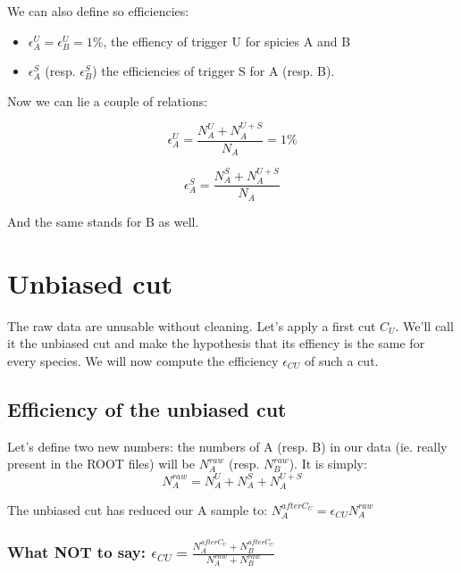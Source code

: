 \documentclass[fleqn,twoside]{article}
\begin{document}
We can also define so efficiencies:
\begin{itemize}
\item $\epsilon_{A}^{U} = \epsilon_{B}^{U} = 1 \%$, the effiency of trigger U for spicies A and B
\item $\epsilon_{A}^{S}$ (resp. $\epsilon_{B}^{S}$) the efficiencies of trigger S for A (resp. B).
\end{itemize}

Now we can lie a couple of relations:

\begin{equation}
  \epsilon_{A}^{U} = \frac{N_{A}^{U} + N_{A}^{U+S}}{N_{A}} = 1 \%
\end{equation}


\begin{equation}
  \epsilon_{A}^{S} = \frac{N_{A}^{S} + N_{A}^{U+S}}{N_{A}}
\end{equation}

And the same stands for B as well.




\section{Unbiased cut}
The raw data are unusable without cleaning. Let's apply a first cut $C_{U}$. We'll call it the unbiased cut and make the hypothesis that its effiency is the same for every species. We will now compute the efficiency $\epsilon_{CU}$ of such a cut.

\subsection{Efficiency of the unbiased cut}
Let's define two new numbers: the numbers of A (resp. B) in our data (ie. really present in the ROOT files) will be $N_{A}^{raw}$ (resp. $N_{B}^{raw}$). It is simply:
\begin{equation}
  \label{rawSample}
  N_{A}^{raw} = N_{A}^{U} + N_{A}^{S} + N_{A}^{U+S}
\end{equation}

The unbiased cut has reduced our A sample to:
$N_{A}^{after C_{U}} = \epsilon_{CU} N_{A}^{raw}$

\subsubsection{What NOT to say: $\epsilon_{CU} = \frac{N_{A}^{after C_{U}} + N_{B}^{after C_{U}}}{N_{A}^{raw} + N_{B}^{raw}}$}
\end{document}
